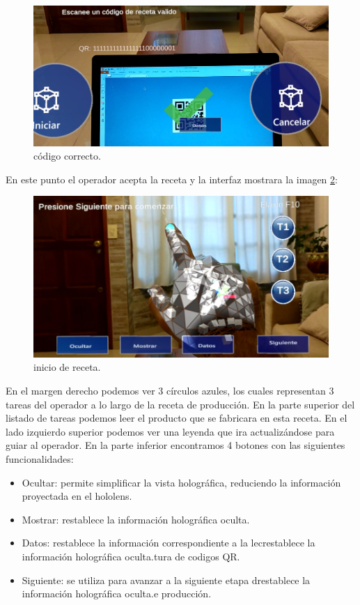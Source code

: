 \begin{figure}[htpb]
	\centering
	\includegraphics[scale=.5]{./Figures/i4.PNG}
	\caption{código correcto\protect\footnotemark.}
	\label{fig:i4}
\end{figure}

En este punto el operador acepta la receta y la interfaz mostrara la imagen \ref{fig:i6}:

\begin{figure}[htpb]
	\centering
	\includegraphics[scale=.5]{./Figures/i6.PNG}
	\caption{inicio de receta\protect\footnotemark.}
	\label{fig:i6}
\end{figure}

En el margen derecho podemos ver 3 círculos azules, los cuales representan 3 tareas del operador a lo largo de la receta de producción. En la parte superior del listado de tareas podemos leer el producto que se fabricara en esta receta. En el lado izquierdo superior podemos ver una leyenda que ira actualizándose para guiar al operador. En la parte inferior encontramos 4 botones con las siguientes funcionalidades:

\begin{itemize}
\item Ocultar: permite simplificar la vista holográfica, reduciendo la información proyectada en el hololens.
\item Mostrar: restablece la información holográfica oculta.
\item Datos: restablece la información correspondiente a la lecrestablece la información holográfica oculta.tura de codigos QR. 
\item Siguiente: se utiliza para avanzar a la siguiente etapa drestablece la información holográfica oculta.e producción. 
\end{itemize}

